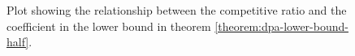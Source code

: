 \begin{figure}\centering
    
    \caption{Plot showing the relationship between the competitive ratio
    and the coefficient in the lower bound in theorem
    \ref{theorem:dpa-lower-bound-half}.}
    \label{fig:dpa-lower-half-plot}
\end{figure}
%
%
%
%
%
%
%
